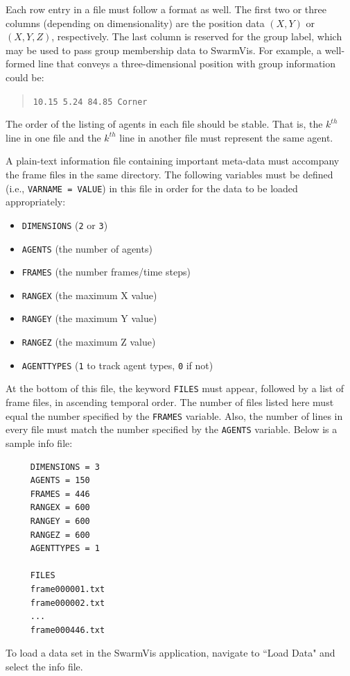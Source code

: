 \documentclass[conference]{IEEEtran}
\begin{document}
Each row entry in a file must follow a format as well. The first two or three  columns (depending on dimensionality) are the
position data $(X, Y)$ or $(X, Y, Z)$, respectively. The last column is reserved for the group label, which may be used to pass
group membership data to SwarmVis.
For example, a well-formed line that conveys a three-dimensional
position with group information could be:
\begin{quote}
\texttt{10.15 5.24 84.85 Corner}
\end{quote}
The order of the listing of agents in each file should be stable.
That is, the $k^{th}$ line in one file and the $k^{th}$ line in another file must represent the same agent.

A plain-text information file containing important meta-data must accompany the frame files in the same directory.
The following variables must be defined (i.e., \texttt{VARNAME = VALUE}) in this file in order for the data to be loaded appropriately:
\begin{itemize}
\item \texttt{DIMENSIONS} (\texttt{2} or \texttt{3})
\item \texttt{AGENTS} (the number of agents)
\item \texttt{FRAMES} (the number frames/time steps)
\item \texttt{RANGEX} (the maximum X value)
\item \texttt{RANGEY} (the maximum Y value)
\item \texttt{RANGEZ} (the maximum Z value)
\item \texttt{AGENTTYPES} (\texttt{1} to track agent types, \texttt{0} if not)
\end{itemize}
At the bottom of this file, the keyword \texttt{FILES} must appear, followed by a list of frame files, in ascending
temporal order.
The number of files listed here must equal the number specified by the \texttt{FRAMES} variable.
Also, the number of lines in every file must match the number specified by the \texttt{AGENTS} variable.
Below is a sample info file:

\vspace{30pt}

\begin{verbatim}
     DIMENSIONS = 3
     AGENTS = 150
     FRAMES = 446
     RANGEX = 600
     RANGEY = 600
     RANGEZ = 600
     AGENTTYPES = 1

     FILES
     frame000001.txt
     frame000002.txt
     ...
     frame000446.txt
\end{verbatim}

To load a data set in the SwarmVis application, navigate to ``Load Data" and select the info file.
\end{document}

